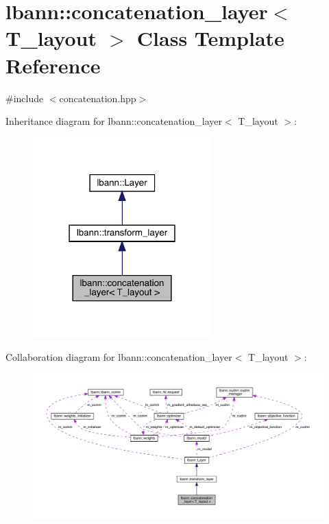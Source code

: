 \hypertarget{classlbann_1_1concatenation__layer}{}\section{lbann\+:\+:concatenation\+\_\+layer$<$ T\+\_\+layout $>$ Class Template Reference}
\label{classlbann_1_1concatenation__layer}


{\ttfamily \#include $<$concatenation.\+hpp$>$}



Inheritance diagram for lbann\+:\+:concatenation\+\_\+layer$<$ T\+\_\+layout $>$\+:\nopagebreak
\begin{figure}[H]
\begin{center}
\leavevmode
\includegraphics[width=195pt]{classlbann_1_1concatenation__layer__inherit__graph}
\end{center}
\end{figure}


Collaboration diagram for lbann\+:\+:concatenation\+\_\+layer$<$ T\+\_\+layout $>$\+:\nopagebreak
\begin{figure}[H]
\begin{center}
\leavevmode
\includegraphics[width=350pt]{classlbann_1_1concatenation__layer__coll__graph}
\end{center}
\end{figure}
